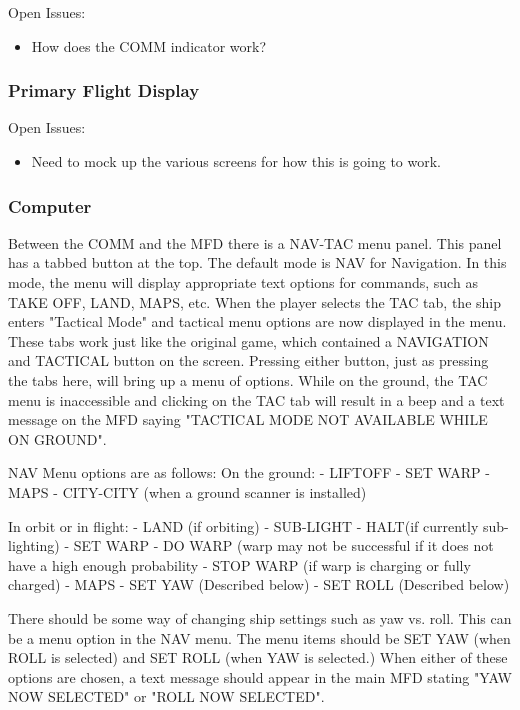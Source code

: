 \begin{itemize}
Open Issues:
\begin{itemize}
\item How does the COMM indicator work?
\end{itemize}

\subsubsection{Primary Flight Display}

Open Issues:
\begin{itemize}
\item Need to mock up the various screens for how this is going to work.
\end{itemize}

\subsubsection{Computer}

Between the COMM and the MFD there is a NAV-TAC menu panel. This panel has a tabbed button at the top. The default mode is NAV for Navigation. In this mode, the menu will display appropriate text options for commands, such as TAKE OFF, LAND, MAPS, etc. When the player selects the TAC tab, the ship enters "Tactical Mode" and tactical menu options are now displayed in the menu. These tabs work just like the original game, which contained a NAVIGATION and TACTICAL button on the screen. Pressing either button, just as pressing the tabs here, will bring up a menu of options. While on the ground, the TAC menu is inaccessible and clicking on the TAC tab will result in a beep and a text message on the MFD saying "TACTICAL MODE NOT AVAILABLE WHILE ON GROUND".

NAV Menu options are as follows: 
On the ground:
- LIFTOFF
- SET WARP
- MAPS
- CITY-CITY (when a ground scanner is installed)

In orbit or in flight:
- LAND (if orbiting)
- SUB-LIGHT
- HALT(if currently sub-lighting)
- SET WARP 
- DO WARP (warp may not be successful if it does not have a high enough probability %
- STOP WARP (if warp is charging or fully charged)
- MAPS
- SET YAW (Described below)
- SET ROLL (Described below)

There should be some way of changing ship settings such as yaw vs.
roll. This can be a menu option in the NAV menu. The menu items should be SET YAW (when ROLL is selected) and SET ROLL (when YAW is selected.) When either of these options are chosen, a text message should appear in the main MFD stating "YAW NOW SELECTED" or "ROLL NOW SELECTED". 


\end{itemize}
